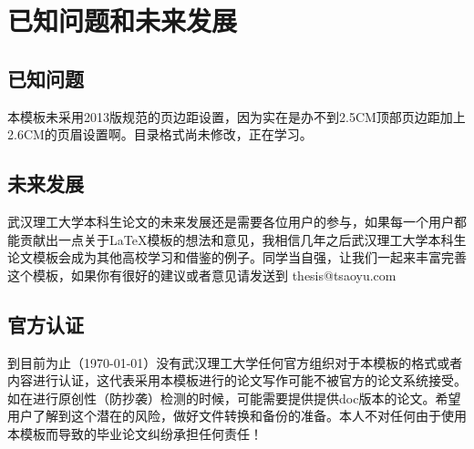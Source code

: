 \section{已知问题和未来发展}
\subsection{已知问题}
本模板未采用2013版规范的页边距设置，因为实在是办不到2.5CM顶部页边距加上2.6CM的页眉设置啊。目录格式尚未修改，正在学习。
\subsection{未来发展}
武汉理工大学本科生论文的未来发展还是需要各位用户的参与，如果每一个用户都能贡献出一点关于\LaTeX 模板的想法和意见，我相信几年之后武汉理工大学本科生论文模板会成为其他高校学习和借鉴的例子。同学当自强，让我们一起来丰富完善这个模板，如果你有很好的建议或者意见请发送到 thesis@tsaoyu.com
\subsection{官方认证}
到目前为止（\today ）没有武汉理工大学任何官方组织对于本模板的格式或者内容进行认证，这代表采用本模板进行的论文写作可能不被官方的论文系统接受。如在进行原创性（防抄袭）检测的时候，可能需要提供提供doc版本的论文。希望用户了解到这个潜在的风险，做好文件转换和备份的准备。本人不对任何由于使用本模板而导致的毕业论文纠纷承担任何责任！